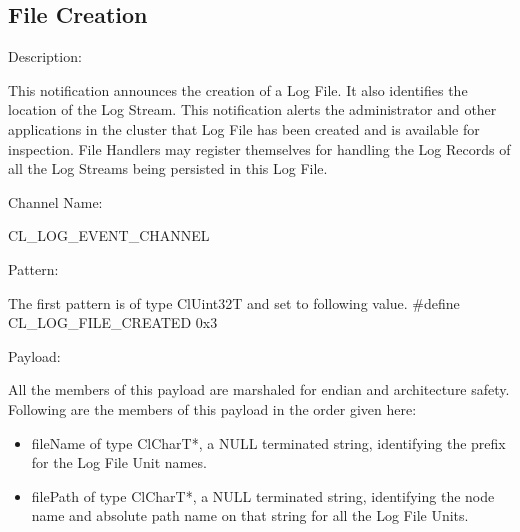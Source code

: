 \begin{flushleft}
\subsection{File Creation}
\begin{Desc}
\item[Description:]\end{Desc}
This notification announces the creation of a Log File. It also identifies the location of the Log Stream. This notification alerts the administrator
and other applications in the cluster that Log File has been created and is available for inspection. File Handlers may register themselves for handling
the Log Records of all the Log Streams being persisted in this Log File.\begin{Desc}
\item[Channel Name:]\end{Desc}
CL\_\-LOG\_\-EVENT\_\-CHANNEL
\begin{Desc}
\item[Pattern:]\end{Desc}
The first pattern is of type ClUint32T and set to following value.
\#define CL\_\-LOG\_\-FILE\_\-CREATED	0x3
\begin{Desc}
\item[Payload:]\end{Desc}
All the members of this payload are marshaled for endian and architecture safety. Following are the members of this payload in the order given here:
\begin{itemize}
\item
fileName of type ClCharT*, a NULL terminated string, identifying the prefix for the Log File Unit names.
\item
filePath of type ClCharT*, a NULL terminated string, identifying the node name and absolute path name on that string for all the Log File Units.
\end{itemize}




\end{flushleft}
